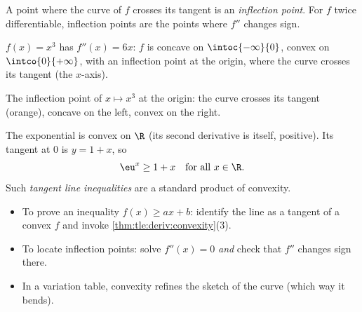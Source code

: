 \begin{definition}\label{def:tle:deriv:inflection}
A point where the curve of $f$ crosses its tangent is an \emph{inflection
point}. For $f$ twice differentiable, inflection
points are the points where $f''$ changes sign.
\end{definition}

\begin{example}\label{ex:tle:deriv:cube}
$f(x) = x^3$ has $f''(x) = 6x$: $f$ is concave on $\intoc{-\infty}{0}$,
convex on $\intco{0}{+\infty}$, with an inflection point at the origin,
where the curve crosses its tangent (the $x$-axis).
\end{example}

\begin{omfigure}

{\small The inflection point of $x \mapsto x^3$ at the origin: the curve
crosses its tangent (orange), concave on the left, convex on the right.}
\end{omfigure}

\begin{example}\label{ex:tle:deriv:ineq}
The exponential is convex on $\R$ (its second derivative is itself, positive).
Its tangent at $0$ is $y = 1 + x$, so
\[
\eu^x \geq 1 + x \quad \text{for all } x \in \R .
\]
Such \emph{tangent line inequalities} are a standard product of convexity.
\end{example}

\begin{method}\label{met:tle:deriv:convexity}
\begin{itemize}
  \item To prove an inequality $f(x) \geq ax + b$: identify the line as a
        tangent of a convex $f$ and invoke
        \cref{thm:tle:deriv:convexity}(3).
  \item To locate inflection points: solve $f''(x) = 0$ \emph{and} check
        that $f''$ changes sign there.
  \item In a variation table, convexity refines the sketch of the curve
        (which way it bends).
\end{itemize}
\end{method}

